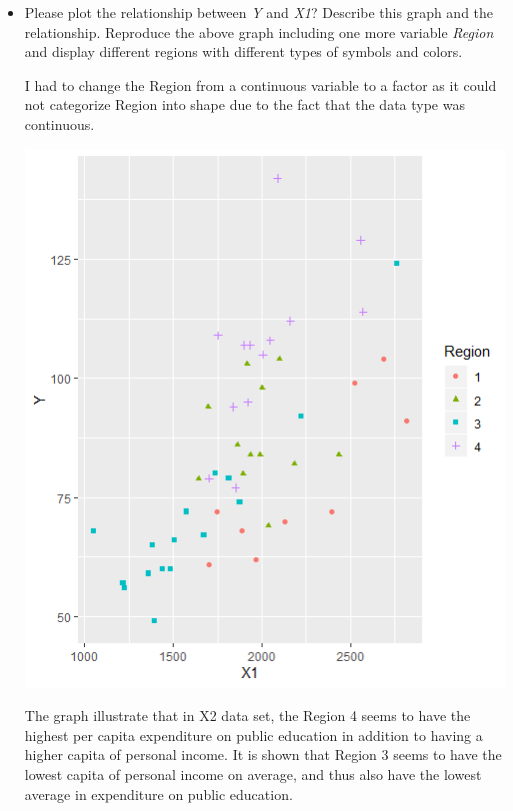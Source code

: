 \documentclass[12pt,letterpaper]{article}
\begin{document}
\begin{itemize}
\vspace{.5cm}
\item
Please plot the relationship between \emph{Y} and \emph{X1}? Describe this graph and the relationship. Reproduce the above graph including one more variable \emph{Region} and display different regions with different types of symbols and colors.


I had to change the Region from a continuous variable to a factor as it could not categorize Region into shape due to the fact that the data type was continuous. 

\includegraphics{Y vs X1R}

The graph illustrate that in X2 data set, the Region 4 seems to have the highest per capita expenditure on public education in addition to having a higher capita of personal income. It is shown that Region 3 seems to have the lowest capita of personal income on average, and thus also have the lowest average in expenditure on public education. 


\end{itemize}
\end{document}
